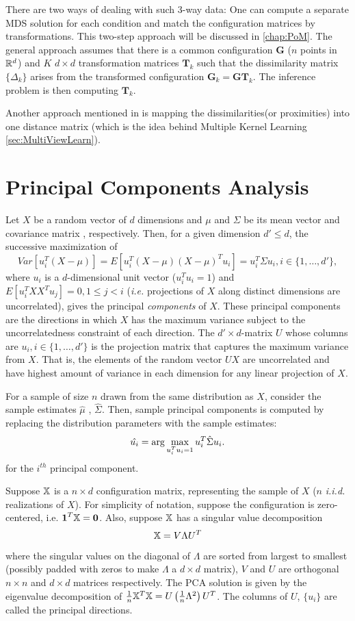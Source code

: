 \documentclass[12pt,oneside,final]{thesis}\usepackage[]{graphicx}\usepackage[]{color}
\begin{document}
There are two ways of dealing with such 3-way data: One can compute a separate MDS solution for  each condition and match the configuration matrices by transformations. This two-step approach will be discussed in \autoref{chap:PoM}. The general approach assumes that there is a common configuration $\mathbf{G}$ ($n$ points in $\mathbb{R}^{d}$) and $K$ $d \times d$ transformation matrices ${\mathbf{T}_k}$ such that the dissimilarity matrix $\{\Delta_k\}$ arises  from the transformed configuration $\mathbf{G}_k =\mathbf{G}\mathbf{T}_k$. The inference problem is then computing $\mathbf{T}_k$.

Another approach mentioned in \cite{borg+groenen:1997} is  mapping the dissimilarities(or proximities) into one distance matrix (which is the idea behind Multiple Kernel Learning \ref{sec:MultiViewLearn}).


\section{Principal Components Analysis}
Let $X$ be a random vector of   $d$ dimensions and $\mu$ and $\Sigma$ be its mean vector and covariance matrix , respectively. Then, for a given dimension $d'\leq d$, the successive maximization of  $$Var[u_{i}^T (X-\mu)]= E[u_{i}^T (X-\mu)(X-\mu)^T u_i]=u_{i}^T\Sigma u_{i},  i \in \{1,\ldots,d'\},$$ where $u_{i}$ is a  $d$-dimensional unit vector ($u_i^Tu_i=1$)  and $E[u_{i}^T X X^T u_j]=0 , 1\leq j<i$ (\textit{i.e.} projections of $X$ along distinct dimensions are uncorrelated), gives the principal \emph{components} of $X$. These principal components are the directions in which $X$ has the maximum variance subject to the uncorrelatedness constraint of each direction. The $d' \times d$-matrix $U$ whose columns are $u_i, i \in \{1,\ldots,d'\}$  is the projection matrix that captures the maximum variance from $X$. That is, the elements of the random vector $UX$ are uncorrelated and have highest amount of variance in each dimension for any linear projection of $X$.

For a sample of size $n$ drawn from the same distribution as $X$, consider the sample estimates $\hat{\mu}$ ,  $\hat{\Sigma} $. Then, sample principal components  is computed by replacing the distribution parameters with the sample estimates:
 \[\hat{u_i}=\arg\max_{u_i^Tu_i=1} u_{i}^T \hat{\Sigma}u_i. \]
for the $i^{th}$ principal component.

Suppose $\mathbb{X}$ is a $n \times d$ configuration matrix, representing the sample of $X$ ($n$ \textit{i.i.d.} realizations of $X$). For simplicity of notation, suppose the configuration is zero-centered, i.e. $\mbox{{\bf 1}} ^T \mathbb{X}  = \bm{0}$. Also, suppose $\mathbb{X}$ has a singular value decomposition $$\mathbb{X}= V\Lambda U^T$$ where the singular values on the diagonal of $\Lambda$ are sorted from largest to smallest (possibly padded with zeros to make $\Lambda$  a $d \times d$ matrix), $V$ and $U$ are orthogonal $n \times n$ and $d \times d$ matrices respectively. The PCA solution is  given by the eigenvalue decomposition of 
$\frac{1}{n} {\mathbb{X}}^T \mathbb{X}=U \left( \frac{1}{n} \Lambda^2 \right) U^T$. The columns of $U$, $\{ u_i \}$ are called the principal directions. 
\end{document}
